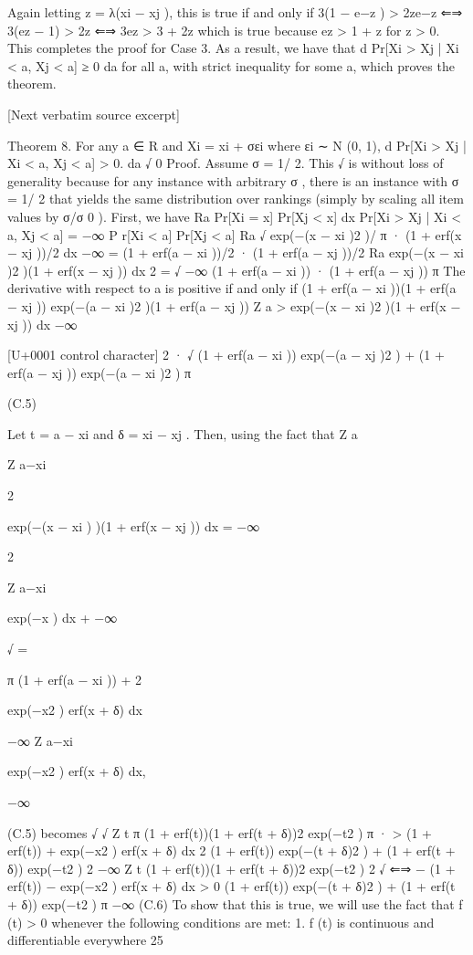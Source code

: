 \documentclass[10pt]{article}
\begin{document}
\begin{ReviewVerbatim}
Again letting z = λ(xi − xj ), this is true if and only if
3(1 − e−z ) > 2ze−z ⇐⇒ 3(ez − 1) > 2z
⇐⇒ 3ez > 3 + 2z
which is true because ez > 1 + z for z > 0. This completes the proof for Case 3.
As a result, we have that
d
Pr[Xi > Xj | Xi < a, Xj < a] ≥ 0
da
for all a, with strict inequality for some a, which proves the theorem.

[Next verbatim source excerpt]

Theorem 8. For any a ∈ R and Xi = xi + σεi where εi ∼ N (0, 1),
d
Pr[Xi > Xj | Xi < a, Xj < a] > 0.
da
√
0
Proof. Assume σ = 1/ 2. This
√ is without loss of generality because for any instance with arbitrary σ , there
is an instance with σ = 1/ 2 that yields the same distribution over rankings (simply by scaling all item
values by σ/σ 0 ). First, we have
Ra
Pr[Xi = x] Pr[Xj < x] dx
Pr[Xi > Xj | Xi < a, Xj < a] = −∞
P r[Xi < a] Pr[Xj < a]
Ra
√
exp(−(x − xi )2 )/ π · (1 + erf(x − xj ))/2 dx
−∞
=
(1 + erf(a − xi ))/2 · (1 + erf(a − xj ))/2
Ra
exp(−(x − xi )2 )(1 + erf(x − xj )) dx
2
= √ −∞
(1 + erf(a − xi )) · (1 + erf(a − xj ))
π
The derivative with respect to a is positive if and only if
(1 + erf(a − xi ))(1 + erf(a − xj )) exp(−(a − xi )2 )(1 + erf(a − xj ))
Z a
>
exp(−(x − xi )2 )(1 + erf(x − xj )) dx
−∞

[U+0001 control character]
2
· √ (1 + erf(a − xi )) exp(−(a − xj )2 ) + (1 + erf(a − xj )) exp(−(a − xi )2 )
π

(C.5)

Let t = a − xi and δ = xi − xj . Then, using the fact that
Z a

Z a−xi

2

exp(−(x − xi ) )(1 + erf(x − xj )) dx =
−∞

2

Z a−xi

exp(−x ) dx +
−∞

√
=

π
(1 + erf(a − xi )) +
2

exp(−x2 ) erf(x + δ) dx

−∞
Z a−xi

exp(−x2 ) erf(x + δ) dx,

−∞

(C.5) becomes
√
√
Z t
π
(1 + erf(t))(1 + erf(t + δ))2 exp(−t2 )
π
·
>
(1
+
erf(t))
+
exp(−x2 ) erf(x + δ) dx
2 (1 + erf(t)) exp(−(t + δ)2 ) + (1 + erf(t + δ)) exp(−t2 )
2
−∞
Z t
(1 + erf(t))(1 + erf(t + δ))2 exp(−t2 )
2
√
⇐⇒
−
(1
+
erf(t))
−
exp(−x2 ) erf(x + δ) dx > 0
(1 + erf(t)) exp(−(t + δ)2 ) + (1 + erf(t + δ)) exp(−t2 )
π −∞
(C.6)
To show that this is true, we will use the fact that f (t) > 0 whenever the following conditions are met:
1. f (t) is continuous and differentiable everywhere
25



\end{ReviewVerbatim}
\end{document}
